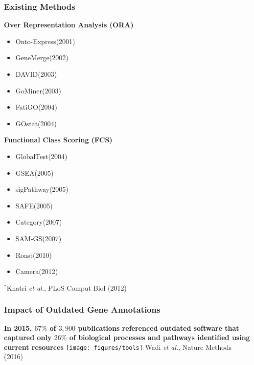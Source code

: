 \documentclass[9pt,t]{beamer}
\begin{document}
\begin{frame}[c]
\frametitle{Existing Methods}
\begin{minipage}[t]{0.45\textwidth}
\flushleft
\textbf{\color{oxygenpurple}Over Representation Analysis (ORA)}
\vspace{0.1cm}
\begin{itemize}
\item Onto-Express(2001)
\item GeneMerge(2002)
\item DAVID(2003) 
\item GoMiner(2003)
\item FatiGO(2004)
\item GOstat(2004)
\end{itemize}
\end{minipage}
\hspace{0.4cm}
\begin{minipage}[t]{0.45\textwidth}
\flushleft
\textbf{\color{oxygenpurple}Functional Class Scoring (FCS)}
\vspace{0.1cm}
\begin{itemize}
\item GlobalTest(2004)
\item GSEA(2005)
\item sigPathway(2005)
\item SAFE(2005)
\item Category(2007)
\item SAM-GS(2007)
\item Roast(2010)
\item Camera(2012)
\end{itemize}
\end{minipage}
\vfill
\hfill $^*$\footnotesize Khatri \emph{et al.},  PLoS Comput Biol (2012)
\end{frame}

\begin{frame}[c]
\frametitle{Impact of Outdated Gene Annotations}
\textbf{\color{oxygenpurple}In 2015, $67\%$ of $3,900$ publications referenced outdated software that captured only $26\%$ of biological processes and pathways identified using current resources}
	 \centering
	 \vfill
	 \texttt{[image: figures/tools]}
	 \vfill
	 \hfill \footnotesize Wadi \emph{et al.},  Nature Methods (2016)
\end{frame}
\end{document}

